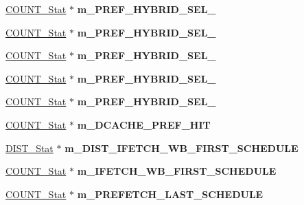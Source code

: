 \begin{DoxyCompactItemize}
\item 
\hypertarget{classall__stats__c_abbb1129e3839dfd49bc278aa7b50284d}{
\hyperlink{classCOUNT__Stat}{COUNT\_\-Stat} $\ast$ {\bfseries m\_\-PREF\_\-HYBRID\_\-SEL\_}}
\label{classall__stats__c_abbb1129e3839dfd49bc278aa7b50284d}

\item 
\hypertarget{classall__stats__c_a4ddf304a8b066c78736790d177c17374}{
\hyperlink{classCOUNT__Stat}{COUNT\_\-Stat} $\ast$ {\bfseries m\_\-PREF\_\-HYBRID\_\-SEL\_}}
\label{classall__stats__c_a4ddf304a8b066c78736790d177c17374}

\item 
\hypertarget{classall__stats__c_ad629e4865ecb50912ebb832816eaa243}{
\hyperlink{classCOUNT__Stat}{COUNT\_\-Stat} $\ast$ {\bfseries m\_\-PREF\_\-HYBRID\_\-SEL\_}}
\label{classall__stats__c_ad629e4865ecb50912ebb832816eaa243}

\item 
\hypertarget{classall__stats__c_a23fc42cf139736e8b0d5a6afe1e210b1}{
\hyperlink{classCOUNT__Stat}{COUNT\_\-Stat} $\ast$ {\bfseries m\_\-PREF\_\-HYBRID\_\-SEL\_}}
\label{classall__stats__c_a23fc42cf139736e8b0d5a6afe1e210b1}

\item 
\hypertarget{classall__stats__c_a4e1134bccdcb82df62ffb171a92d0b36}{
\hyperlink{classCOUNT__Stat}{COUNT\_\-Stat} $\ast$ {\bfseries m\_\-PREF\_\-HYBRID\_\-SEL\_}}
\label{classall__stats__c_a4e1134bccdcb82df62ffb171a92d0b36}

\item 
\hypertarget{classall__stats__c_ad6aa524f1736890908068eb233d1a6f9}{
\hyperlink{classCOUNT__Stat}{COUNT\_\-Stat} $\ast$ {\bfseries m\_\-DCACHE\_\-PREF\_\-HIT}}
\label{classall__stats__c_ad6aa524f1736890908068eb233d1a6f9}

\item 
\hypertarget{classall__stats__c_a4e96ce640bc537c7bf967bfe99e54111}{
\hyperlink{classDIST__Stat}{DIST\_\-Stat} $\ast$ {\bfseries m\_\-DIST\_\-IFETCH\_\-WB\_\-FIRST\_\-SCHEDULE}}
\label{classall__stats__c_a4e96ce640bc537c7bf967bfe99e54111}

\item 
\hypertarget{classall__stats__c_ab51ff325266e3078715c1b021383f841}{
\hyperlink{classCOUNT__Stat}{COUNT\_\-Stat} $\ast$ {\bfseries m\_\-IFETCH\_\-WB\_\-FIRST\_\-SCHEDULE}}
\label{classall__stats__c_ab51ff325266e3078715c1b021383f841}

\item 
\hypertarget{classall__stats__c_aff9877c2fd15b5fbb1021ded9625bb9c}{
\hyperlink{classCOUNT__Stat}{COUNT\_\-Stat} $\ast$ {\bfseries m\_\-PREFETCH\_\-LAST\_\-SCHEDULE}}
\label{classall__stats__c_aff9877c2fd15b5fbb1021ded9625bb9c}


\end{DoxyCompactItemize}
